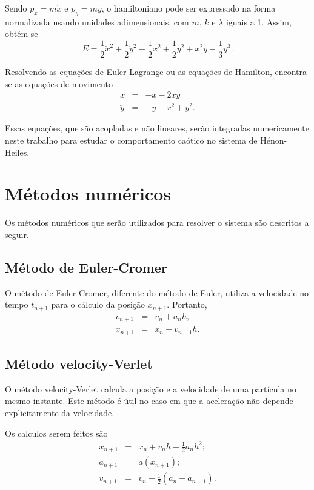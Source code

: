 \documentclass[brazilian, 10pt, a4paper, final]{article}
\begin{document}
\begin{multicols*}{2}
Sendo $p_x=m\dot{x}$ e $p_y=m\dot{y}$, o hamiltoniano pode ser expressado na forma normalizada usando unidades adimensionais, com $m$, $k$ e $\lambda$ iguais a 1. Assim, obtém-se
\begin{equation}
  E=\frac{1}{2}\dot{x}^2+\frac{1}{2}\dot{y}^2+\frac{1}{2}x^2+\frac{1}{2}y^2+x^2y-\frac{1}{3}y^3.
\end{equation}

Resolvendo as equações de Euler-Lagrange ou as equações de Hamilton, encontra-se as equações de movimento 
\begin{eqnarray}
  \ddot{x}&=&-x-2xy \\
  \ddot{y}&=&-y-x^2+y^2.
\end{eqnarray}

Essas equações, que são acopladas e não lineares, serão integradas numericamente neste trabalho para estudar o comportamento caótico no sistema de Hénon-Heiles.

\section{Métodos numéricos}

Os métodos numéricos que serão utilizados para resolver o sistema são descritos a seguir.

\subsection{Método de Euler-Cromer}
O método de Euler-Cromer, diferente do método de Euler, utiliza a velocidade no tempo $t_{n+1}$ para o cálculo da posição $x_{n+1}$.
Portanto,
\begin{eqnarray}
  v_{n+1}&=&v_n+a_nh, \\
  x_{n+1}&=&x_n+v_{n+1}h.
\end{eqnarray}

\subsection{Método velocity-Verlet}
O método velocity-Verlet calcula a posição e a velocidade de uma partícula no mesmo instante. Este método é útil no caso em que a aceleração não depende explicitamente da velocidade.

Os calculos serem feitos são
\begin{eqnarray}
  x_{n+1}&=&x_n+v_{n}h+\frac{1}{2}a_nh^2; \\
  a_{n+1}&=&a(x_{n+1}); \\
  v_{n+1}&=&v_n+\frac{1}{2}(a_n+a_{n+1}).
\end{eqnarray}



\end{multicols*}
\end{document}

